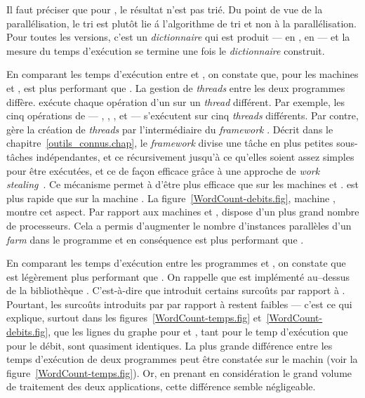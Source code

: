 Il faut pr\'eciser que pour , le r\'esultat n'est pas tri\'e. Du point de vue de la parall\'elisation, le tri est plut\^ot lie \'a l'algorithme de tri et non \`a la parall\'elisation. Pour toutes les versions, c'est un \emph{dictionnaire} qui est produit ---  en ,  en  --- et la mesure du temps d'exécution se termine une fois le \emph{dictionnaire} construit.



En comparant les temps d'ex\'ecution entre  et , on constate que, pour les machines  et ,  est plus performant que . La gestion de \emph{threads} entre les deux programmes diff\`ere.  ex\'ecute chaque op\'eration d'un  sur un \emph{thread} diff\'erent. Par exemple, les cinq op\'erations de  --- , , ,  et  --- s'ex\'ecutent sur cinq \emph{threads} diff\'erents. Par contre,  g\`ere la cr\'eation de \emph{threads} par l'interm\'ediaire du \emph{framework} . D\'ecrit dans le chapitre~\ref{outils_connus.chap}, le \emph{framework} divise une t\^ache en plus petites sous-t\^aches ind\'ependantes, et ce r\'ecursivement jusqu'\`a ce qu'elles soient assez simples pour \^etre ex\'ecut\'ees, et ce de façon efficace grâce à une approche de \emph{work stealing}~\citep{FrigoLeiRan98}. Ce m\'ecanisme permet \`a  d'\^etre plus efficace que  sur les machines  et .  est plus rapide que  sur la machine . La figure~\ref{WordCount-debits.fig}, machine , montre cet aspect. Par rapport aux machines  et ,  dispose d'un plus grand nombre de processeurs. Cela a permis d'augmenter le nombre d'instances parall\`eles d'un \emph{farm} dans le programme  et en cons\'equence  est plus performant que . 



En comparant les temps d'ex\'ecution entre les programmes  et , on constate que  est l\'eg\`erement plus performant que . On rappelle que  est impl\'ement\'e au–dessus de la biblioth\`eque . C'est-\`a-dire que  introduit certains surco\^uts par rapport \`a . Pourtant, les surco\^uts introduits par  par rapport \`a  restent faibles --- c'est ce qui explique, surtout dans les figures~\ref{WordCount-temps.fig} et~\ref{WordCount-debits.fig}, que les lignes du graphe pour  et , tant pour le temp d'ex\'ecution que pour le d\'ebit, sont quasiment identiques. La plus grande diff\'erence entre les temps d'ex\'ecution de deux programmes peut \^etre constat\'ee sur le machin  (voir la figure~\ref{WordCount-temps.fig}). Or, en prenant en consid\'eration le grand volume de traitement des deux applications, cette diff\'erence semble n\'egligeable.

